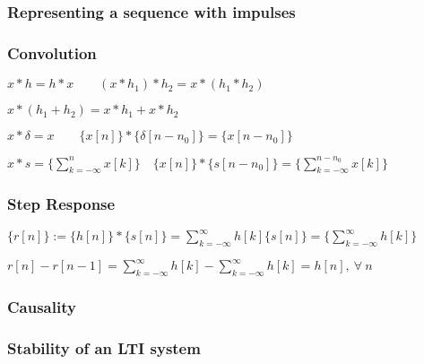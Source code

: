 \documentclass[7pt,a4paper]{scrartcl}
\begin{document}
\begin{multicols*}{4}
\subsubsection*{Representing a sequence with impulses}

\mbox{}

\subsubsection*{Convolution}


$x\ast h=h\ast x\qquad (x\ast h_1)\ast h_2=x\ast (h_1\ast h_2)$ 

$x\ast(h_1+h_2)=x\ast h_1+x\ast h_2$ 

\finn

$ x\ast\delta=x\qquad \{x[n]\}\ast\{\delta[n-n_0]\}=\{x[n-n_0]\}$

$x\ast s=\{\sum\limits_{k=-\infty}^n x[k]\}\quad \{x[n]\}\ast\{s[n-n_0]\}=\{\sum\limits_{k=-\infty}^{n-n_0}x[k]\}$


\subsubsection*{Step Response}

\small
$\{r[n]\}:=\{h[n]\}\ast\{s[n]\}=\sum\limits_{k=-\infty}^\infty h[k]\{s[n]\}=\{\sum\limits_{k=-\infty}^\infty h[k]\}$\normalsize

$r[n]-r[n-1]=\sum\limits_{k=-\infty}^\infty h[k]-\sum\limits_{k=-\infty}^\infty h[k]=h[n],\ \forall\ n$

\subsubsection*{Causality}



\subsubsection*{Stability of an LTI system}


\end{multicols*}
\end{document}
